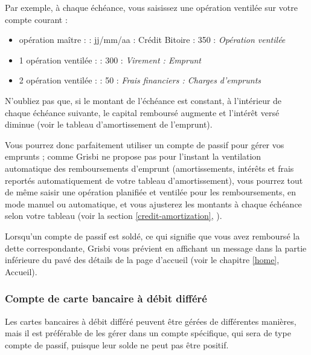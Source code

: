 Par exemple, à chaque échéance, vous saisissez une opération ventilée sur votre compte courant :

\begin{itemize}
	\item opération maître  :  : jj/mm/aa   : Crédit Bitoire   : 350   : \emph{Opération ventilée}
	\item 1 opération ventilée :  : 300   : \emph{Virement : Emprunt}
	\item 2 opération ventilée :  : 50   : \emph{Frais financiers : Charges d'emprunts}
\end{itemize}

N'oubliez pas que, si le montant de l'échéance est constant, à l'intérieur de chaque échéance suivante, le capital remboursé augmente et l'intérêt versé diminue (voir le tableau d'amortissement de l'emprunt).  

Vous pourrez donc parfaitement utiliser un compte de passif pour gérer vos emprunts ; comme Grisbi ne propose pas pour l'instant la ventilation automatique des remboursements d'emprunt (amortissements, intérêts et frais reportés automatiquement de votre tableau d'amortissement), vous pourrez tout de même saisir une opération planifiée et ventilée pour les remboursements, en mode manuel ou automatique, et vous ajusterez les montants à chaque échéance selon votre tableau (voir la section \vref{credit-amortization}, ).

Lorsqu'un compte de passif est soldé, ce qui signifie que vous avez remboursé la dette correspondante, Grisbi vous prévient en affichant un message dans la partie inférieure du pavé des détails de la page d'accueil (voir le chapitre \vref{home}, Accueil). 


\subsubsection{Compte de carte bancaire à débit différé\label{accounts-type-cash-deferredCards}}

Les cartes bancaires à débit différé peuvent être gérées de différentes manières, mais il est préférable de les gérer dans un compte spécifique, qui sera de type compte de passif, puisque leur solde ne peut pas être positif.

